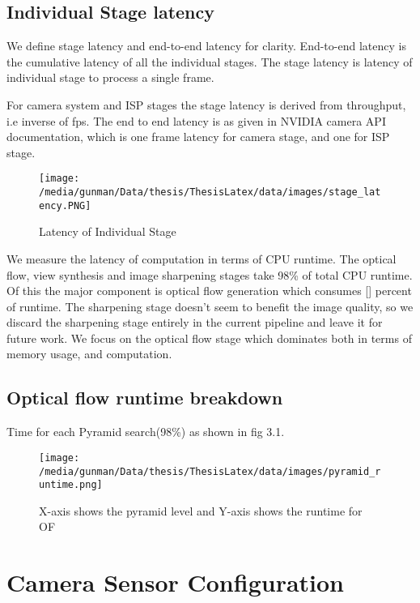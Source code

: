 \subsection{Individual Stage latency}
We define stage latency and end-to-end latency for clarity. End-to-end latency is the cumulative latency of all the individual stages. The stage latency is latency of individual stage to process a single frame. 

For camera system and ISP stages the stage latency is derived from throughput, i.e inverse of fps. The end to end latency is as given in NVIDIA camera API documentation, which is one frame latency for camera stage, and one for ISP stage.

\begin{figure}[h]
	\begin{center}
		\texttt{[image: /media/gunman/Data/thesis/ThesisLatex/data/images/stage\_latency.PNG]}
		\caption{Latency of Individual Stage}
		\label{fig:ex_4_9}
	\end{center}
	\vspace{-0.3in}
\end{figure} 

We measure the latency of computation in terms of CPU runtime. The optical flow, view synthesis and image sharpening stages take 98\% of total CPU runtime. Of this the major component is optical flow generation which consumes [] percent of runtime. The sharpening stage doesn't seem to benefit the image quality, so we discard the sharpening stage entirely in the current pipeline and leave it for future work. We focus on the optical flow stage which dominates both in terms of memory usage, and computation. 


\subsection{Optical flow runtime breakdown}
Time for each Pyramid search(98\%) as shown in fig 3.1.
\begin{figure}[h]
	\begin{center}
		\texttt{[image: /media/gunman/Data/thesis/ThesisLatex/data/images/pyramid\_runtime.png]}
		\caption{X-axis shows the pyramid level and Y-axis shows the runtime for OF}
		\label{fig:ex_4_9}
	\end{center}
	\vspace{-0.3in}
\end{figure} 

\section{Camera Sensor Configuration}
